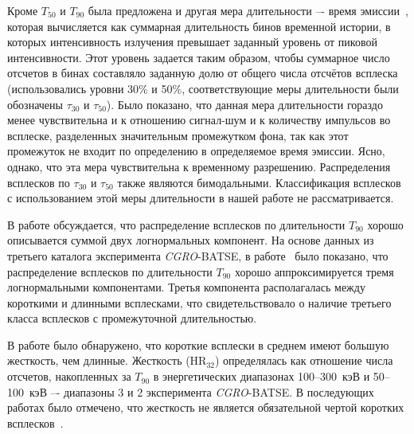 Кроме $T_{50}$ и $T_{90}$ была предложена и другая мера длительности –- время эмиссии~\citep{Mitrofanov_1999}, которая вычисляется как суммарная длительность бинов временной истории, в которых интенсивность излучения превышает заданный уровень от пиковой интенсивности. Этот уровень задается таким образом, чтобы суммарное число отсчетов в бинах составляло заданную долю от общего числа отсчётов всплеска (использовались уровни 30\% и 50\%, соответствующие меры длительности были обозначены $\tau_{30}$ и $\tau_{50}$). Было показано, что данная мера длительности гораздо менее чувствительна и к отношению сигнал-шум и к количеству импульсов во всплеске, разделенных значительным промежутком фона, так как этот промежуток не входит по определению в определяемое время эмиссии. Ясно, однако, что эта мера чувствительна к временному разрешению. Распределения всплесков по $\tau_{30}$ и $\tau_{50}$  также являются бимодальными. Классификация всплесков с использованием этой меры длительности в нашей работе не рассматривается. 

В работе \citep{McBreen_1994} обсуждается, что распределение всплесков по длительности $T_{90}$ хорошо описывается суммой двух логнормальных компонент. На основе данных из третьего каталога эксперимента \textit{CGRO}-BATSE, в работе~\citep{Horvath_2002} было показано, что распределение всплесков по длительности $T_{90}$ хорошо аппроксимируется тремя логнормальными компонентами. Третья компонента располагалась между короткими и длинными всплесками, что свидетельствовало о наличие третьего класса всплесков с промежуточной длительностью.

В работе \citep{Kouveliotou_1993}  было обнаружено, что короткие всплески в среднем имеют большую жесткость, чем длинные. Жесткость (HR$_{32}$) определялась как отношение числа отсчетов, накопленных за $T_{90}$ в энергетических диапазонах 100--300~кэВ и 50--100~кэВ –- диапазоны 3 и 2 эксперимента \textit{CGRO}-BATSE. В последующих работах было отмечено, что жесткость не является обязательной чертой коротких всплесков~\citep[см. например][]{Sakamoto_2006_proc, Norris_and_Bonnel_2006}. 

